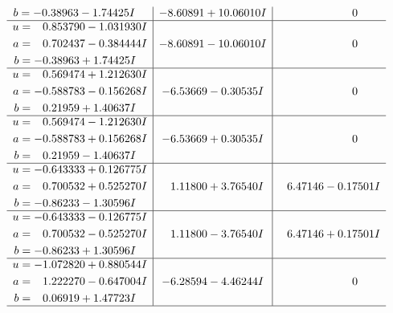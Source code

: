\documentclass[1p]{elsarticle_modified}
\theoremstyle{definition}
\begin{document}
$$\begin{array}{c|c|c}
\begin{aligned}
b &= -0.38963 - 1.74425 I\end{aligned}
 & -8.60891 + 10.06010 I & \phantom{-0.000000 } 0 \\ \hline\begin{aligned}
u &= \phantom{-}0.853790 - 1.031930 I \\
a &= \phantom{-}0.702437 - 0.384444 I \\
b &= -0.38963 + 1.74425 I\end{aligned}
 & -8.60891 - 10.06010 I & \phantom{-0.000000 } 0 \\ \hline\begin{aligned}
u &= \phantom{-}0.569474 + 1.212630 I \\
a &= -0.588783 - 0.156268 I \\
b &= \phantom{-}0.21959 + 1.40637 I\end{aligned}
 & -6.53669 - 0.30535 I & \phantom{-0.000000 } 0 \\ \hline\begin{aligned}
u &= \phantom{-}0.569474 - 1.212630 I \\
a &= -0.588783 + 0.156268 I \\
b &= \phantom{-}0.21959 - 1.40637 I\end{aligned}
 & -6.53669 + 0.30535 I & \phantom{-0.000000 } 0 \\ \hline\begin{aligned}
u &= -0.643333 + 0.126775 I \\
a &= \phantom{-}0.700532 + 0.525270 I \\
b &= -0.86233 - 1.30596 I\end{aligned}
 & \phantom{-}1.11800 + 3.76540 I & \phantom{-}6.47146 - 0.17501 I \\ \hline\begin{aligned}
u &= -0.643333 - 0.126775 I \\
a &= \phantom{-}0.700532 - 0.525270 I \\
b &= -0.86233 + 1.30596 I\end{aligned}
 & \phantom{-}1.11800 - 3.76540 I & \phantom{-}6.47146 + 0.17501 I \\ \hline\begin{aligned}
u &= -1.072820 + 0.880544 I \\
a &= \phantom{-}1.222270 - 0.647004 I \\
b &= \phantom{-}0.06919 + 1.47723 I\end{aligned}
 & -6.28594 - 4.46244 I & \phantom{-0.000000 } 0\\
 \hline 
 \end{array}$$\newpage$$\begin{array}{c|c|c}  

\end{array}$$
\end{document}
